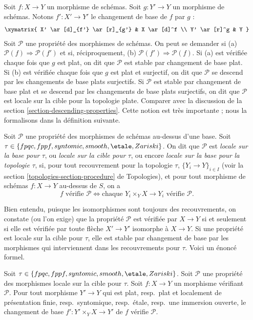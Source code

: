 \noindent
Soit $f : X \to Y$ un morphisme de schémas. Soit $g : Y' \to Y$ un
morphisme de schémas. Notons $f' : X' \to Y'$ le changement de base de $f$
par $g$ :
$$
\xymatrix{
X' \ar[d]_{f'} \ar[r]_{g'} & X \ar[d]^f \\
Y' \ar[r]^g & Y
}
$$
Soit $\mathcal{P}$ une propriété des morphismes de schémas. On peut se
demander si (a) $\mathcal{P}(f) \Rightarrow \mathcal{P}(f')$ et si,
réciproquement, (b) $\mathcal{P}(f') \Rightarrow \mathcal{P}(f)$. Si (a) est
vérifiée chaque fois que $g$ est plat, on dit que $\mathcal{P}$ est stable
par changement de base plat. Si (b) est vérifiée chaque fois que $g$ est plat
et surjectif, on dit que $\mathcal{P}$ se descend par les changements de base
plats surjectifs. Si $\mathcal{P}$ est stable par changement de base plat et
se descend par les changements de base plats surjectifs, on dit que
$\mathcal{P}$ est locale sur la cible pour la topologie plate. Comparer avec
la discussion de la section \ref{section-descending-properties}. Cette notion
est très importante ; nous la formalisons dans la définition suivante.

\begin{definition}
\label{definition-property-morphisms-local}
Soit $\mathcal{P}$ une propriété des morphismes de schémas au-dessus d'une
base. Soit $\tau \in \{fpqc, fppf, syntomic, smooth, \etale, Zariski\}$.
On dit que $\mathcal{P}$ est {\it locale sur la base pour $\tau$}, ou
{\it locale sur la cible pour $\tau$}, ou encore {\it locale sur la base
pour la topologie $\tau$}, si, pour tout recouvrement pour la topologie
$\tau$, $\{Y_i \to Y\}_{i \in I}$ (voir la section
\ref{topologies-section-procedure} de Topologies), et pour tout morphisme de schémas
$f : X \to Y$ au-dessus de $S$, on a
$$
f \text{ vérifie }\mathcal{P}
\Leftrightarrow
\text{chaque }Y_i \times_Y X \to Y_i\text{ vérifie }\mathcal{P}.
$$
\end{definition}

\noindent
Bien entendu, puisque les isomorphismes sont toujours des recouvrements, on
constate (ou l'on exige) que la propriété $\mathcal{P}$ est vérifiée par
$X \to Y$ si et seulement si elle est vérifiée par toute flèche
$X' \to Y'$ isomorphe à $X \to Y$. Si une propriété est locale sur la cible
pour $\tau$, elle est stable par changement de base par les morphismes qui
interviennent dans les recouvrements pour $\tau$. Voici un énoncé formel.

\begin{lemma}
\label{lemma-pullback-property-local-target}
Soit $\tau \in \{fpqc, fppf, syntomic, smooth, \etale, Zariski\}$.
Soit $\mathcal{P}$ une propriété des morphismes locale sur la cible pour
$\tau$. Soit $f : X \to Y$ un morphisme vérifiant $\mathcal{P}$. Pour tout
morphisme $Y' \to Y$ qui est plat, resp.\ plat et localement de présentation
finie, resp.\ syntomique, resp.\ \'etale, resp.\ une immersion ouverte, le
changement de base $f' : Y' \times_Y X \to Y'$ de $f$ vérifie
$\mathcal{P}$.
\end{lemma}

